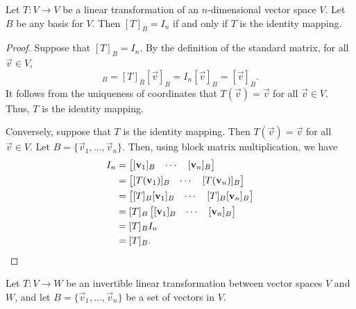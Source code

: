 \documentclass{homework}
\begin{document}
	\question Let $T : V \to V$ be a linear transformation of an $n$-dimensional vector space $V$. Let $B$ be any basis for $V$. Then $[T]_B = I_n$ if and only if $T$ is the identity mapping.
	\begin{proof}
		Suppose that $[T]_B = I_n$. By the definition of the standard matrix, for all $\vec{v} \in V$,
		\begin{equation*}
			[T(\vec{v})]_B = [T]_B[\vec{v}]_B = I_n[\vec{v}]_B = [\vec{v}]_B.
		\end{equation*}
		It follows from the uniqueness of coordinates that $T(\vec{v}) = \vec{v}$ for all $\vec{v} \in V$. Thus, $T$ is the identity mapping.
		
		Conversely, suppose that $T$ is the identity mapping. Then $T(\vec{v}) = \vec{v}$ for all $\vec{v} \in V$. Let $B = \{\vec{v}_1, \dots, \vec{v}_n\}$. Then, using block matrix multiplication, we have
		\begin{equation*}
			\begin{aligned}
			I_n &= \left[\begin{matrix}[\mathbf{v}_1]_B & \cdots& [\mathbf{v}_n]_B\end{matrix}\right] \\
			&= \left[\begin{matrix}[T(\mathbf{v}_1)]_B & \cdots& [T(\mathbf{v}_n)]_B\end{matrix}\right] \\
			&= \left[\begin{matrix}[T]_B[\mathbf{v}_1]_B & \cdots&[T]_B [\mathbf{v}_n]_B\end{matrix}\right] \\
			&= [T]_B \left[\begin{matrix}[\mathbf{v}_1]_B & \cdots& [\mathbf{v}_n]_B\end{matrix}\right] \\
			&= [T]_B I_n \\
			&= [T]_B.
			\end{aligned}
		\end{equation*}
	\end{proof}
	
	\question 
	
	\question Let $T : V \to W$ be an invertible linear transformation between vector spaces $V$ and $W$, and let $B = \{\vec{v}_1, \dots, \vec{v}_n\}$ be a set of vectors in $V$.
	
\end{document}

